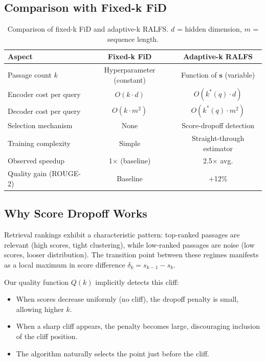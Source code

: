 \subsection*{Comparison with Fixed-k FiD}

\begin{table}[h]
\centering
\small
\begin{tabular}{lcc}
\toprule
\textbf{Aspect} & \textbf{Fixed-k FiD} & \textbf{Adaptive-k RALFS} \\
\midrule
Passage count $k$ & Hyperparameter (constant) & Function of $\mathbf{s}$ (variable) \\
Encoder cost per query & $O(k \cdot d)$ & $O(k^*(q) \cdot d)$ \\
Decoder cost per query & $O(k \cdot m^2)$ & $O(k^*(q) \cdot m^2)$ \\
Selection mechanism & None & Score-dropoff detection \\
Training complexity & Simple & Straight-through estimator \\
Observed speedup & 1$\times$ (baseline) & 2.5$\times$ avg. \\
Quality gain (ROUGE-2) & Baseline & +12\% \\
\bottomrule
\end{tabular}
\caption{Comparison of fixed-k FiD and adaptive-k RALFS. $d$ = hidden dimension, $m$ = sequence length.}
\label{tab:complexity}
\end{table}

\subsection*{Why Score Dropoff Works}

Retrieval rankings exhibit a characteristic pattern: top-ranked passages are relevant (high scores, tight clustering), while low-ranked passages are noise (low scores, looser distribution). The transition point between these regimes manifests as a local maximum in score difference $\delta_k = s_{k-1} - s_k$.

Our quality function $Q(k)$ implicitly detects this cliff:
\begin{itemize}
\item When scores decrease uniformly (no cliff), the dropoff penalty is small, allowing higher $k$.
\item When a sharp cliff appears, the penalty becomes large, discouraging inclusion of the cliff position.
\item The algorithm naturally selects the point just before the cliff.
\end{itemize}

